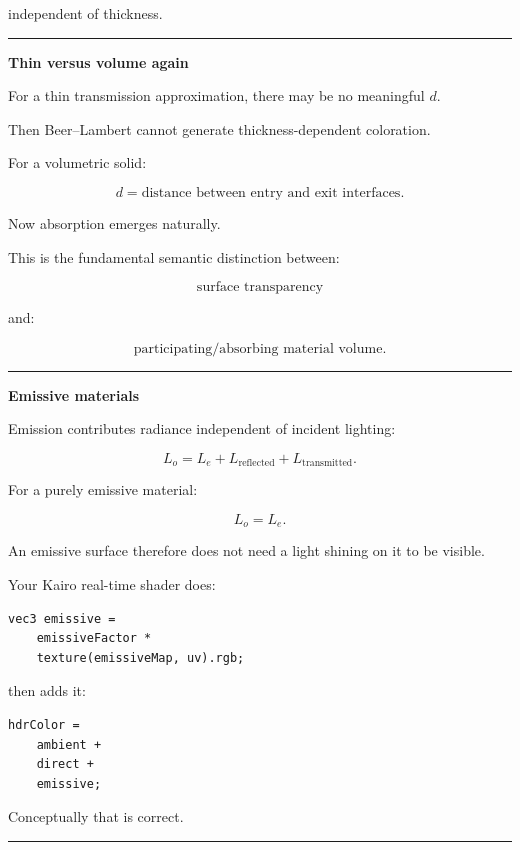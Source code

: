 independent of thickness.

\begin{center}\rule{0.5\linewidth}{0.5pt}\end{center}

\textbf{Thin versus volume again}

For a thin transmission approximation, there may be no meaningful \(d\).

Then Beer--Lambert cannot generate thickness-dependent coloration.

For a volumetric solid:

\[
d=
\text{distance between entry and exit interfaces}.
\]

Now absorption emerges naturally.

This is the fundamental semantic distinction between:

\[
\boxed{\text{surface transparency}}
\]

and:

\[
\boxed{\text{participating/absorbing material volume}}.
\]

\begin{center}\rule{0.5\linewidth}{0.5pt}\end{center}

\textbf{Emissive materials}

Emission contributes radiance independent of incident lighting:

\[
\boxed{
L_o=
L_e+
L_{\text{reflected}}
+
L_{\text{transmitted}}.
}
\]

For a purely emissive material:

\[
L_o=L_e.
\]

An emissive surface therefore does not need a light shining on it to be visible.

Your Kairo real-time shader does:

\begin{verbatim}
vec3 emissive =
    emissiveFactor *
    texture(emissiveMap, uv).rgb;
\end{verbatim}

then adds it:

\begin{verbatim}
hdrColor =
    ambient +
    direct +
    emissive;
\end{verbatim}

Conceptually that is correct.

\begin{center}\rule{0.5\linewidth}{0.5pt}\end{center}

